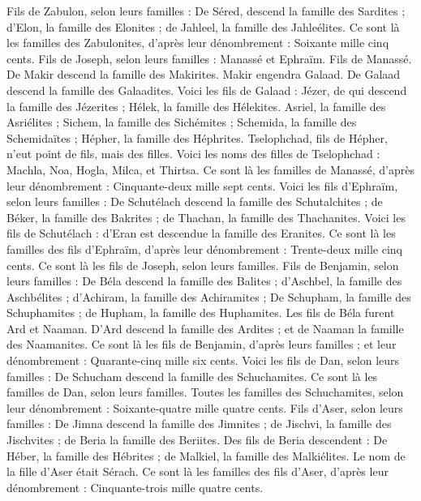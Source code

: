 \begin{multicols}{2}
Fils de Zabulon, selon leurs familles : De Séred, descend la famille des Sardites ; d'Elon, la famille des Elonites ; de Jahleel, la famille des Jahleélites.
Ce sont là les familles des Zabulonites, d’après leur dénombrement : Soixante mille cinq cents.
Fils de Joseph, selon leurs familles : Manassé et Ephraïm.
Fils de Manassé. De Makir descend la famille des Makirites. Makir engendra Galaad. De Galaad descend la famille des Galaadites.
Voici les fils de Galaad : Jézer, de qui descend la famille des Jézerites ; Hélek, la famille des Hélekites.
Asriel, la famille des Asriélites ; Sichem, la famille des Sichémites ;
Schemida, la famille des Schemidaïtes ; Hépher, la famille des Héphrites.
Tselophchad, fils de Hépher, n'eut point de fils, mais des filles. Voici les noms des filles de Tselophchad : Machla, Noa, Hogla, Milca, et Thirtsa.
Ce sont là les familles de Manassé, d’après leur dénombrement : Cinquante-deux mille sept cents.
Voici les fils d'Ephraïm, selon leurs familles : De Schutélach descend la famille des Schutalchites ; de Béker, la famille des Bakrites ; de Thachan, la famille des Thachanites.
Voici les fils de Schutélach : d’Eran est descendue la famille des Eranites.
Ce sont là les familles des fils d'Ephraïm, d’après leur dénombrement : Trente-deux mille cinq cents. Ce sont là les fils de Joseph, selon leurs familles.
Fils de Benjamin, selon leurs familles : De Béla descend la famille des Balites ; d'Aschbel, la famille des Aschbélites ; d'Achiram, la famille des Achiramites ;
De Schupham, la famille des Schuphamites ; de Hupham, la famille des Huphamites.
Les fils de Béla furent Ard et Naaman. D'Ard descend la famille des Ardites ; et de Naaman la famille des Naamanites.
Ce sont là les fils de Benjamin, d’après leurs familles ; et leur dénombrement : Quarante-cinq mille six cents.
Voici les fils de Dan, selon leurs familles : De Schucham descend la famille des Schuchamites. Ce sont là les familles de Dan, selon leurs familles.
Toutes les familles des Schuchamites, selon leur dénombrement : Soixante-quatre mille quatre cents.
Fils d'Aser, selon leurs familles : De Jimna descend la famille des Jimnites ; de Jischvi, la famille des Jischvites ; de Beria la famille des Beriites.
Des fils de Beria descendent : De Héber, la famille des Hébrites ; de Malkiel, la famille des Malkiélites.
Le nom de la fille d'Aser était Sérach.
Ce sont là les familles des fils d'Aser, d’après leur dénombrement : Cinquante-trois mille quatre cents.

\end{multicols}
